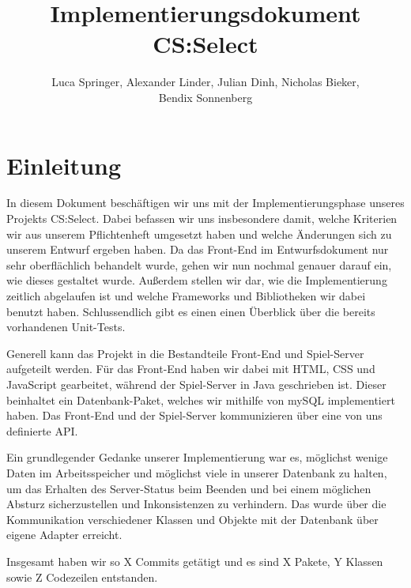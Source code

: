 \documentclass[a4paper]{scrreprt}
\begin{document}
\title{Implementierungsdokument CS:Select}
\author{Luca Springer, Alexander Linder, Julian Dinh, Nicholas Bieker,\\ Bendix Sonnenberg}
\maketitle

\tableofcontents


\chapter{Einleitung}

In diesem Dokument beschäftigen wir uns mit der Implementierungsphase unseres Projekts CS:Select. Dabei befassen wir uns insbesondere damit, welche Kriterien wir aus unserem Pflichtenheft umgesetzt haben und welche Änderungen sich zu unserem Entwurf ergeben haben. Da das Front-End im Entwurfsdokument nur sehr oberflächlich behandelt wurde, gehen wir nun nochmal genauer darauf ein, wie dieses gestaltet wurde. Außerdem stellen wir dar, wie die Implementierung zeitlich abgelaufen ist und welche Frameworks und Bibliotheken wir dabei benutzt haben. Schlussendlich gibt es einen einen Überblick über die bereits vorhandenen Unit-Tests.

\hspace{1cm}

Generell kann das Projekt in die Bestandteile Front-End und Spiel-Server aufgeteilt werden. Für das Front-End haben wir dabei mit HTML, CSS und JavaScript gearbeitet, während der Spiel-Server in Java geschrieben ist. Dieser beinhaltet ein Datenbank-Paket, welches wir mithilfe von mySQL implementiert haben. Das Front-End und der Spiel-Server kommunizieren über eine von uns definierte API.

\hspace{1cm}

Ein grundlegender Gedanke unserer Implementierung war es, möglichst wenige Daten im Arbeitsspeicher und möglichst viele in unserer Datenbank zu halten, um das Erhalten des Server-Status beim Beenden und bei einem möglichen Absturz sicherzustellen und Inkonsistenzen zu verhindern. Das wurde über die Kommunikation verschiedener Klassen und Objekte mit der Datenbank über eigene Adapter erreicht. 

\hspace{1cm}

Insgesamt haben wir so X Commits getätigt und es sind X Pakete, Y Klassen sowie Z Codezeilen entstanden. %
\end{document}
